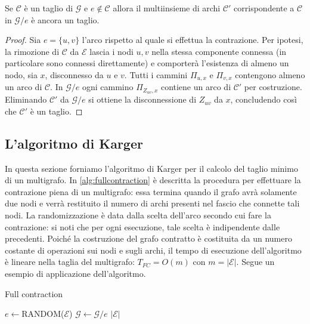 \begin{corollario}
Se $\mathcal{C}$ è un taglio di $\mathcal{G}$ e $e\notin\mathcal{C}$ allora il multiinsieme di archi $\mathcal{C'}$ corrispondente a $\mathcal{C}$ in $\mathcal{G}/e$ è ancora un taglio.
\end{corollario}
\begin{proof}
Sia $e=\{u,v\}$ l'arco rispetto al quale si effettua la contrazione. Per ipotesi, la rimozione di $\mathcal{C}$ da $\mathcal{E}$ lascia i nodi $u,v$ nella stessa componente connessa (in particolare sono connessi direttamente) e comporterà l'esistenza di almeno un nodo, sia $x$, disconnesso da $u$ e $v$. Tutti i cammini $\Pi_{u,x}$ e $\Pi_{v,x}$ contengono almeno un arco di $\mathcal{C}$.
In $\mathcal{G}/e$ ogni cammino $\Pi_{Z_{uv},x}$ contiene un arco di $\mathcal{C'}$ per costruzione. Eliminando $\mathcal{C'}$ da $\mathcal{G}/e$ si ottiene la disconnessione di $Z_{uv}$ da $x$, concludendo così che $\mathcal{C'}$ è un taglio.
\end{proof}

\subsection{L'algoritmo di Karger}
In questa sezione forniamo l'algoritmo di Karger per il calcolo del taglio minimo di un multigrafo. In \ref{alg:fullcontraction} è descritta la procedura per effettuare la contrazione piena di un multigrafo: essa termina quando il grafo avrà solamente due nodi e verrà restituito il numero di archi presenti nel fascio che connette tali nodi. La randomizzazione è data dalla scelta dell'arco secondo cui fare la contrazione: si noti che per ogni esecuzione, tale scelta è indipendente dalle precedenti. Poiché la costruzione del grafo contratto è costituita da un numero costante di operazioni sui nodi e sugli archi, il tempo di esecuzione dell'algoritmo è lineare nella taglia del multigrafo: $T_{FC}=O(m)$ con $m=|\mathcal{E}|$. Segue un esempio di applicazione dell'algoritmo.

\begin{algorithm}
\caption{Full contraction}
\label{alg:fullcontraction}
\begin{algorithmic}
		\State $e \gets$RANDOM($\mathcal{E}$)
		\State $\mathcal{G} \gets \mathcal{G}/e$
	\EndFor
	\State \Return $|\mathcal{E}|$
\EndFunction
\end{algorithmic}
\end{algorithm}

